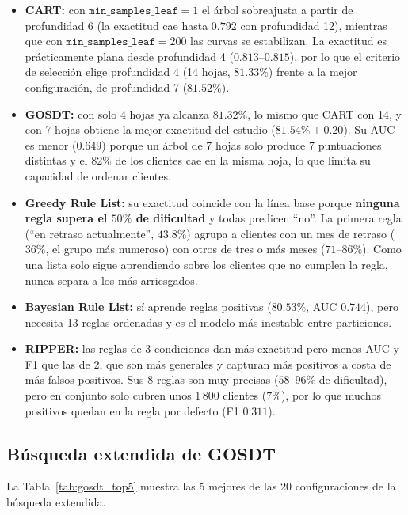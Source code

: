 \documentclass[a4paper,11pt]{article}
\begin{document}
\begin{itemize}
    \item \textbf{CART:} con $\texttt{min\_samples\_leaf}=1$ el árbol sobreajusta a partir de profundidad 6 (la exactitud cae hasta $0.792$ con profundidad 12), mientras que con $\texttt{min\_samples\_leaf}=200$ las curvas se estabilizan. La exactitud es prácticamente plana desde profundidad 4 ($0.813$--$0.815$), por lo que el criterio de selección elige profundidad 4 (14 hojas, $81.33\%$) frente a la mejor configuración, de profundidad 7 ($81.52\%$).
    \item \textbf{GOSDT:} con solo 4 hojas ya alcanza $81.32\%$, lo mismo que CART con 14, y con 7 hojas obtiene la mejor exactitud del estudio ($81.54\% \pm 0.20$). Su AUC es menor ($0.649$) porque un árbol de 7 hojas solo produce 7 puntuaciones distintas y el $82\%$ de los clientes cae en la misma hoja, lo que limita su capacidad de ordenar clientes.
    \item \textbf{Greedy Rule List:} su exactitud coincide con la línea base porque \textbf{ninguna regla supera el $50\%$ de dificultad} y todas predicen ``no''. La primera regla (``en retraso actualmente'', $43.8\%$) agrupa a clientes con un mes de retraso ($36\%$, el grupo más numeroso) con otros de tres o más meses ($71$--$86\%$). Como una lista solo sigue aprendiendo sobre los clientes que no cumplen la regla, nunca separa a los más arriesgados.
    \item \textbf{Bayesian Rule List:} sí aprende reglas positivas ($80.53\%$, AUC $0.744$), pero necesita 13 reglas ordenadas y es el modelo más inestable entre particiones.
    \item \textbf{RIPPER:} las reglas de 3 condiciones dan más exactitud pero menos AUC y F1 que las de 2, que son más generales y capturan más positivos a costa de más falsos positivos. Sus 8 reglas son muy precisas ($58$--$96\%$ de dificultad), pero en conjunto solo cubren unos 1\,800 clientes ($7\%$), por lo que muchos positivos quedan en la regla por defecto (F1 $0.311$).
\end{itemize}

\subsection{Búsqueda extendida de GOSDT}
La Tabla~\ref{tab:gosdt_top5} muestra las 5 mejores de las 20 configuraciones de la búsqueda extendida.
\end{document}

